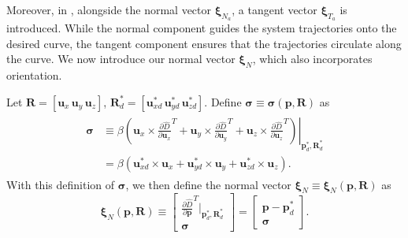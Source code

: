 Moreover, in \cite{Rezende2022}, alongside the normal vector $\boldsymbol{\xi}_{N_a}$, a tangent vector $\boldsymbol{\xi}_{T_a}$ is introduced. While the normal component guides the system trajectories onto the desired curve, the tangent component ensures that the trajectories circulate along the curve. We now introduce our normal vector $\boldsymbol{\xi}_N$, which also incorporates orientation.

Let $\mathbf{R}=\left[\mathbf{u}_x\,\mathbf{u}_y\,\mathbf{u}_z\right]$, $\mathbf{R}^*_d=\left[\mathbf{u}^*_{xd}\,\mathbf{u}^*_{yd}\,\mathbf{u}^*_{zd}\right]$. Define $\boldsymbol{\sigma}\equiv\boldsymbol{\sigma}(\mathbf{p}, \mathbf{R})$ as
\begin{align}
\begin{split}
    \boldsymbol{\sigma}&\equiv\beta\!\!\left.\left(\mathbf{u}_x\times \frac{\partial \widehat{D}}{\partial \mathbf{u}_x}^T\!\!\!\! + \mathbf{u}_y\times \frac{\partial \widehat{D}}{\partial \mathbf{u}_y}^T\!\!\!\! + \mathbf{u}_z\times \frac{\partial \widehat{D}}{\partial \mathbf{u}_z}^T\right)\right|_{\mathbf{p}_d^*, \mathbf{R}_d^*}\\
    &= \beta\left(\mathbf{u}^*_{xd}\times\mathbf{u}_x + \mathbf{u}^*_{yd}\times\mathbf{u}_y + \mathbf{u}^*_{zd}\times\mathbf{u}_z\right).
\end{split}
\end{align}
With this definition of $\boldsymbol{\sigma}$, we then define the normal vector $\boldsymbol{\xi}_N\equiv\boldsymbol{\xi}_N(\mathbf{p}, \mathbf{R})$ as
\begin{equation}
     \boldsymbol{\xi}_N(\mathbf{p}, \mathbf{R}) \equiv \begin{bmatrix}
         \frac{\partial \widehat{D}}{\partial \mathbf{p}}^T\Big|_{\mathbf{p}_d^*, \mathbf{R}_d^*}\\ \boldsymbol{\sigma}
     \end{bmatrix} 
     = \begin{bmatrix}
         \mathbf{p} - \mathbf{p}_d^*\\ \boldsymbol{\sigma}
     \end{bmatrix}.
\end{equation}
